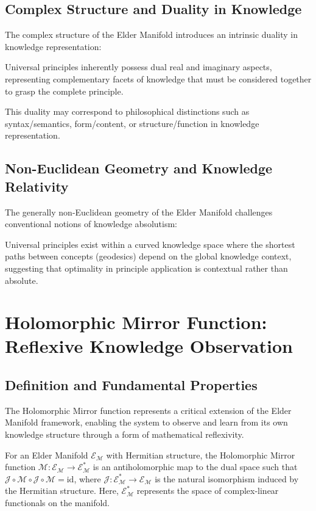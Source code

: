 \subsection{Complex Structure and Duality in Knowledge}

The complex structure of the Elder Manifold introduces an intrinsic duality in knowledge representation:

\begin{proposition}
Universal principles inherently possess dual real and imaginary aspects, representing complementary facets of knowledge that must be considered together to grasp the complete principle.
\end{proposition}

This duality may correspond to philosophical distinctions such as syntax/semantics, form/content, or structure/function in knowledge representation.

\subsection{Non-Euclidean Geometry and Knowledge Relativity}

The generally non-Euclidean geometry of the Elder Manifold challenges conventional notions of knowledge absolutism:

\begin{proposition}
Universal principles exist within a curved knowledge space where the shortest paths between concepts (geodesics) depend on the global knowledge context, suggesting that optimality in principle application is contextual rather than absolute.
\end{proposition}

\section{Holomorphic Mirror Function: Reflexive Knowledge Observation}

\subsection{Definition and Fundamental Properties}

The Holomorphic Mirror function represents a critical extension of the Elder Manifold framework, enabling the system to observe and learn from its own knowledge structure through a form of mathematical reflexivity.

\begin{definition}
For an Elder Manifold $\mathcal{E}_{\mathcal{M}}$ with Hermitian structure, the Holomorphic Mirror function $\mathcal{M}: \mathcal{E}_{\mathcal{M}} \rightarrow \mathcal{E}_{\mathcal{M}}^*$ is an antiholomorphic map to the dual space such that $\mathcal{J} \circ \mathcal{M} \circ \mathcal{J} \circ \mathcal{M} = \text{id}$, where $\mathcal{J}: \mathcal{E}_{\mathcal{M}}^* \rightarrow \mathcal{E}_{\mathcal{M}}$ is the natural isomorphism induced by the Hermitian structure. Here, $\mathcal{E}_{\mathcal{M}}^*$ represents the space of complex-linear functionals on the manifold.
\end{definition}


